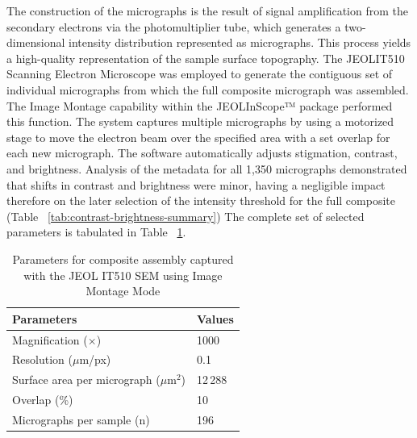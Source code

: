 \documentclass[3p,twocolumn]{elsarticle}
\begin{document}
The construction of the micrographs is the result of signal amplification from
the secondary electrons via the photomultiplier tube, which generates a
two-dimensional intensity distribution represented as micrographs. This process
yields a high-quality representation of the sample surface topography. The
JEOL\texttrademark IT510 Scanning Electron Microscope was employed to generate
the contiguous set of individual micrographs from which the full composite
micrograph was assembled. The Image Montage capability within the JEOLInScope™
package performed this function. The system captures multiple micrographs by
using a motorized stage to move the electron beam over the specified area with a
set overlap for each new micrograph. The software automatically adjusts
stigmation, contrast, and brightness. Analysis of the metadata for all 1,350
micrographs demonstrated that shifts in contrast and brightness were minor,
having a negligible impact therefore on the later selection of the intensity
threshold for the full composite (Table ~\ref{tab:contrast-brightness-summary})
The complete set of selected parameters is tabulated in Table
~\ref{tab:microscopy_parameters}.

\begin{table}[ht]
  \centering
  \caption{Contrast (C) and Brightness (C) Summary by Sammple}
  \label{tab:contrast-brightness-summary}
\end{table}

\begin{table}
  \centering
  \caption{Parameters for composite assembly captured with the JEOL IT510 SEM using Image Montage Mode}
  \label{tab:microscopy_parameters}
  \begin{tabular}{l l}
    \hline
    Parameters & Values \\
    \hline
    Magnification ($\times$)                    & 1000 \\
    Resolution ($\mu$m/px)               & 0.1 \\
    Surface area per micrograph ($\mu$m$^2$) & 12\,288 \\
    Overlap (\%)                          & 10 \\
    Micrographs per sample (n)            & 196 \\
    \hline
  \end{tabular}%
\end{table}
\end{document}
